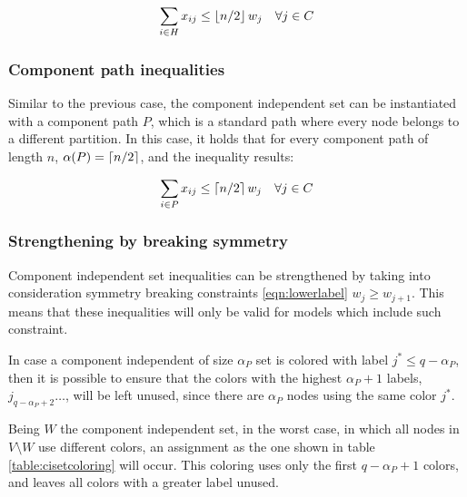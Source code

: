 \begin{equation}
\label{ineq:chole}
\sum _{i \in H} x_{ij} \leq \left\lfloor n / 2 \right\rfloor w_{j} \quad \forall j \in C
\end{equation}

\subsubsection{Component path inequalities}

Similar to the previous case, the component independent set can be instantiated with a component path $P$, which is a standard path where every node belongs to a different partition. In this case, it holds that for every component path of length $n$, $\alpha(P) = \left\lceil n / 2 \right\rceil$, and the inequality results:

\begin{equation}
\label{ineq:cpath}
\sum _{i \in P} x_{ij} \leq \left\lceil n / 2 \right\rceil w_{j} \quad \forall j \in C
\end{equation}

\subsubsection{Strengthening by breaking symmetry}

Component independent set inequalities can be strengthened by taking into consideration symmetry breaking constraints \ref{eqn:lowerlabel} $w_j \geq w_{j+1}$. This means that these inequalities will only be valid for models which include such constraint.

In case a component independent of size $\alpha_P$ set is colored with label $j^* \leq q - \alpha_P$, then it is possible to ensure that the colors with the highest $\alpha_P +1$ labels, $j_{q-\alpha_P+2} \ldots$, will be left unused, since there are $\alpha_P$ nodes using the same color $j^*$.

Being $W$ the component independent set, in the worst case, in which all nodes in $V \setminus W$ use different colors, an assignment as the one shown in table \ref{table:cisetcoloring} will occur. This coloring uses only the first $q - \alpha_P + 1$ colors, and leaves all colors with a greater label unused. 


